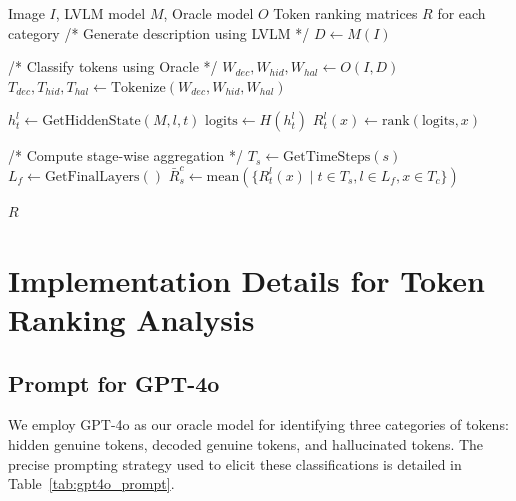 \documentclass{article}
\theoremstyle{plain}
\theoremstyle{definition}
\theoremstyle{remark}
\begin{document}
\begin{algorithm}[t]
\caption{Token Ranking Analysis Framework}
\label{alg:token_rank}
\begin{algorithmic}[1]
\REQUIRE Image $I$, LVLM model $M$, Oracle model $O$
\ENSURE Token ranking matrices $R$ for each category
\STATE /* Generate description using LVLM */
\STATE $D \leftarrow M(I)$ 

\STATE /* Classify tokens using Oracle */
\STATE $W_{dec}, W_{hid}, W_{hal} \leftarrow O(I, D)$ 
\STATE $T_{dec}, T_{hid}, T_{hal} \leftarrow \text{Tokenize}(W_{dec}, W_{hid}, W_{hal})$

            \STATE $h_t^l \leftarrow \text{GetHiddenState}(M, l, t)$ 
            \STATE $\text{logits} \leftarrow H(h_t^l)$ 
                \STATE $R_t^l(x) \leftarrow \text{rank}(\text{logits}, x)$ 
            \ENDFOR
        \ENDFOR
    \ENDFOR
\ENDFOR

\STATE /* Compute stage-wise aggregation */
        \STATE $T_s \leftarrow \text{GetTimeSteps}(s)$ 
        \STATE $L_f \leftarrow \text{GetFinalLayers}()$ 
        \STATE $\bar{R}_s^c \leftarrow \text{mean}(\{R_t^l(x) \mid t \in T_s, l \in L_f, x \in T_c\})$
    \ENDFOR
\ENDFOR

\OUTPUT $R$ 
\end{algorithmic}
\end{algorithm}

\section{Implementation Details for Token Ranking Analysis}\label{appendix:token_analysis}

\subsection{Prompt for GPT-4o}
We employ GPT-4o as our oracle model for identifying three categories of tokens: hidden genuine tokens, decoded genuine tokens, and hallucinated tokens. The precise prompting strategy used to elicit these classifications is detailed in Table~\ref{tab:gpt4o_prompt}.
\end{document}
